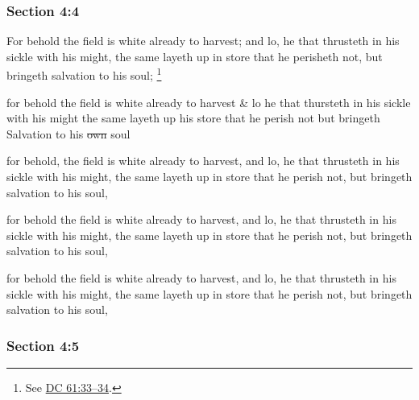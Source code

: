 	\subsubsection{Section 4:4} %
		\label{DC4-4}

		For behold the field is white already to harvest; and lo, he that thrusteth in his sickle with his might, the same layeth up in store that he perisheth not, but bringeth salvation to his soul;%
			\footnote{%
				See \hyperref[DC61-33]{DC 61:33--34}.
				}

		\begin{framed}
		\scriptsize
			\begin{compactdesc}
				\item[JSP] for behold the field is white already to harvest \& lo he that thursteth in his sickle with his might the same layeth up his store that he perish not but bringeth Salvation to his \sout{own} soul
				\item[RB1] [\textit{missing}]
				\item[BC] for behold, the field is white already to harvest, and lo, he that thrusteth in his sickle with his might, the same layeth up in store that he perish not, but bringeth salvation to his soul, 
				\item[DC 1835] for behold the field is white already to harvest, and lo, he that thrusteth in his sickle with his might, the same layeth up in store that he perish not, but bringeth salvation to his soul,
				\item[DC 1844] for behold the field is white already to harvest, and lo, he that thrusteth in his sickle with his might, the same layeth up in store that he perish not, but bringeth salvation to his soul,
			\end{compactdesc}
		\end{framed}

	\subsubsection{Section 4:5} %
		\label{DC4-5}

